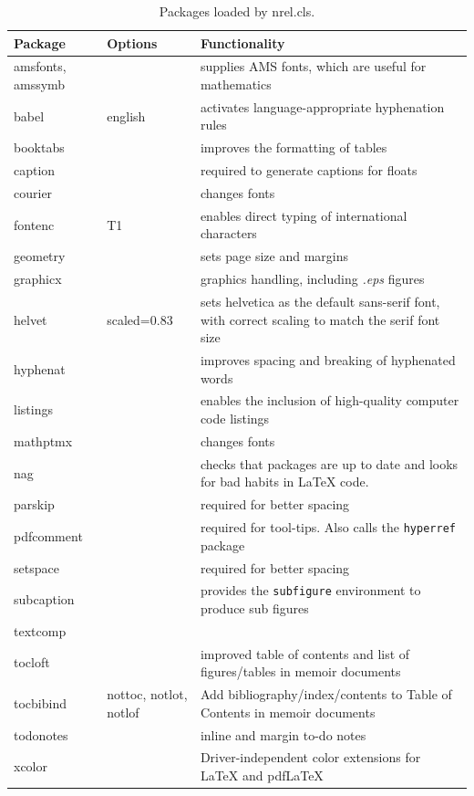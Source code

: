 \begin{table}[!h]
\centering
\caption[Packages loaded by the nrel.cls class]{Packages loaded by nrel.cls.}
\label{Tab:Packages}
\begin{tabular*}{\textwidth}{llp{}}
\toprule
Package & Options & Functionality\\
\midrule
amsfonts, amssymb & & supplies AMS fonts, which are useful for mathematics \\
babel & english & activates language-appropriate hyphenation rules\\
booktabs & & improves the formatting of tables \\
caption & & required to generate captions for floats\\
courier& & changes fonts \\
fontenc & T1 & enables direct typing of international characters \\
geometry & & sets page size and margins \\
graphicx & & graphics handling, including \emph{.eps} figures \\
helvet& scaled=0.83 & sets helvetica as the default sans-serif font, with correct scaling to match the serif font size\\
hyphenat & & improves spacing and breaking of hyphenated words \\
listings & & enables the inclusion of high-quality computer code listings\\
mathptmx& & changes fonts \\
nag & & checks that packages are up to date and looks for bad habits in LaTeX code. \\
parskip & & required for better spacing\\
pdfcomment & & required for tool-tips. Also calls the \texttt{hyperref} package  \\
setspace & & required for better spacing\\
subcaption & & provides the \texttt{subfigure} environment to produce sub figures \\
textcomp & & \\
tocloft & & improved table of contents and list of figures/tables in memoir documents\\
tocbibind & nottoc, notlot, notlof & Add bibliography/index/contents to Table of Contents in memoir documents\\
todonotes & & inline and margin to-do notes \\
xcolor & & Driver-independent color extensions for LaTeX and pdfLaTeX\\
\bottomrule
\end{tabular*}
\end{table}

